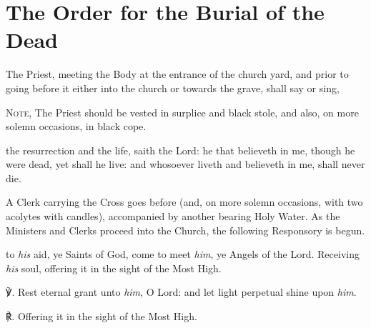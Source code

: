 \fancyhead[RE,LO]{\textit{}}
\section{The Order for the Burial of the Dead}

\begin{rubric}
    The Priest, meeting the Body at the entrance of the church yard, and prior to going before it either into the church or towards the grave, shall say or sing,\par
    \textsc{Note,} The Priest should be vested in surplice and black stole, and also, on more solemn occasions, in black cope.
\end{rubric}
 the resurrection and the life, saith the Lord: he that believeth in me, though he were dead, yet shall he live: and whosoever liveth and believeth in me, shall never die.\par

\begin{rubric}
	A Clerk carrying the Cross goes before (and, on more solemn occasions, with two acolytes with candles), accompanied by another bearing Holy Water. As the Ministers and Clerks proceed into the Church, the following Responsory is begun.
\end{rubric}

 to \textit{his} aid, ye Saints of God, come to meet \textit{him}, ye Angels of the Lord. Receiving \textit{his} soul, offering it in the sight of the Most High.\par
{}
℣. Rest eternal grant unto \textit{him}, O Lord: and let light perpetual shine upon \textit{him}.\par
℟. Offering it in the sight of the Most High.

